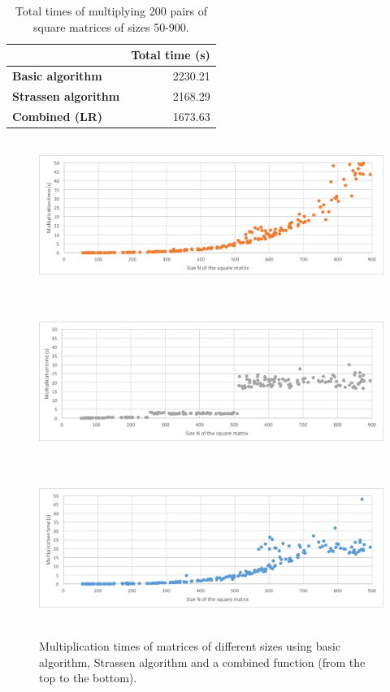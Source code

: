\begin{table}[]
	\captionsetup{justification=centering,margin=0.5cm}
\bgroup
\def\arraystretch{1.5}%
\begin{center}
	\begin{tabular}{|l|r|}
		\hline
		& \multicolumn{1}{l|}{\textbf{Total time (s)}} \\ \hline
		\textbf{Basic algorithm}    & 2230.21                                      \\ \hline
		\textbf{Strassen algorithm} & 2168.29                                       \\ \hline
		\textbf{Combined (LR)}      & 1673.63                                       \\ \hline
	\end{tabular}
\end{center}
\egroup
\caption{Total times of multiplying 200 pairs of square matrices of sizes 50-900.}
\label{tab:matrix_results}
\end{table}


\begin{figure}[h!]
	\captionsetup{justification=centering,margin=0.5cm}
	\centerline{
		\mbox{
			\includegraphics[width=130mm]{./img/matrix_mul_basic.png}
		}
	}
	\centerline{
	\mbox{
		\includegraphics[width=130mm]{./img/matrix_mul_strassen.png}
	}
}
	\centerline{
	\mbox{
		\includegraphics[width=130mm]{./img/matrix_mul_combined.png}
	}
}
	\caption{Multiplication times of matrices of different sizes using basic algorithm, Strassen algorithm and a combined function (from the top to the bottom).}
	\label{fig:matrix_mul_graph}
\end{figure}


